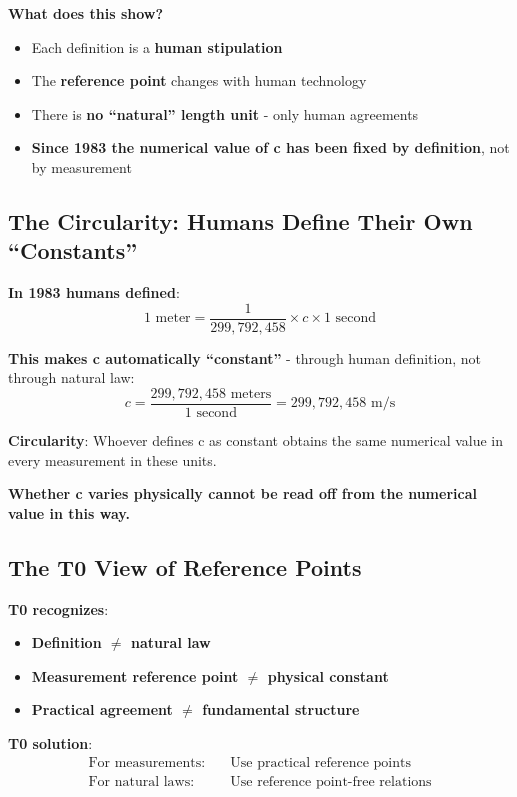 	\textbf{What does this show?}
	\begin{itemize}
		\item Each definition is a \textbf{human stipulation}
		\item The \textbf{reference point} changes with human technology
		\item There is \textbf{no ``natural'' length unit} - only human agreements
		\item \textbf{Since 1983 the numerical value of c has been fixed by definition}, not by measurement
	\end{itemize}
	
	\subsection{The Circularity: Humans Define Their Own ``Constants''}
	
	\textbf{In 1983 humans defined}:
	\begin{equation}
		1 \text{ meter} = \frac{1}{299,792,458} \times c \times 1 \text{ second}
	\end{equation}
	
	\textbf{This makes c automatically ``constant''} - through human definition, not through natural law:
	\begin{equation}
		c = \frac{299,792,458 \text{ meters}}{1 \text{ second}} = 299,792,458 \text{ m/s}
	\end{equation}
	
	\textbf{Circularity}: Whoever defines c as constant obtains the same numerical value in every measurement in these units.
	
	\textbf{Whether c varies physically cannot be read off from the numerical value in this way.}
	
	\subsection{The T0 View of Reference Points}
	
	\textbf{T0 recognizes}:
	\begin{itemize}
		\item \textbf{Definition $\neq$ natural law}
		\item \textbf{Measurement reference point $\neq$ physical constant}
		\item \textbf{Practical agreement $\neq$ fundamental structure}
	\end{itemize}
	
	\textbf{T0 solution}:
	\begin{align}
		\text{For measurements:} \quad &\text{Use practical reference points} \\
		\text{For natural laws:} \quad &\text{Use reference point-free relations}
	\end{align}
	
